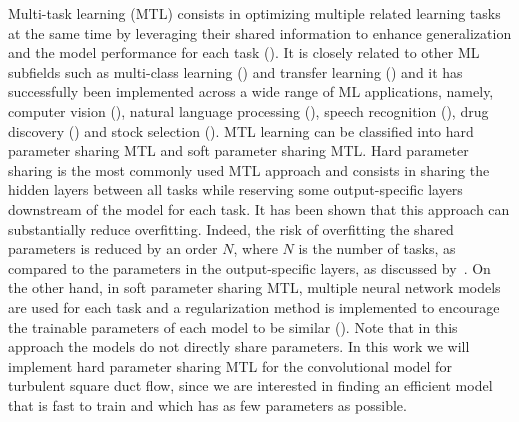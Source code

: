 \documentclass[11pt]{article}
\numberwithin{equation}{section}
\theoremstyle{plain}
\theoremstyle{definition}
\begin{document}
Multi-task learning (MTL) consists in optimizing multiple related learning tasks at the same time by leveraging their shared information to enhance generalization and the model performance for each task (\cite{multi-task_learning,mt_thung,zhang2021surveymt}). It is closely related to other ML subfields such as multi-class learning (\cite{Aly2005SurveyOM}) and transfer learning (\cite{5288526}) and it has successfully been implemented across a wide range of ML applications, namely, computer vision (\cite{fast_r_cnn}), natural language processing (\cite{Collobert2008AUA}), speech recognition (\cite{Deng2013NewTO}), drug discovery (\cite{ramsundar2015massively}) and stock selection (\cite{stock_mt}). %
MTL learning can be classified into hard parameter sharing MTL and soft parameter sharing MTL. Hard parameter sharing is the most commonly used MTL approach and consists in sharing the hidden layers between all tasks while reserving some output-specific layers downstream of the model for each task. It has been shown that this approach can substantially reduce overfitting. Indeed, the risk of overfitting the shared parameters is reduced by an order $N$, where $N$ is the number of tasks, as compared to the parameters in the output-specific layers, as discussed by~\cite{Baxter97abayesian/information}. On the other hand, in soft parameter sharing MTL, multiple neural network models are used for each task and a regularization method is implemented to encourage the trainable parameters of each model to be similar (\cite{Duong2015LowRD,Yang2017TraceNR}). Note that in this approach the models do not directly share parameters. In this work we will implement hard parameter sharing MTL for the convolutional model for turbulent square duct flow, since we are interested in finding an efficient model that is fast to train and which has as few parameters as possible.
\end{document}
